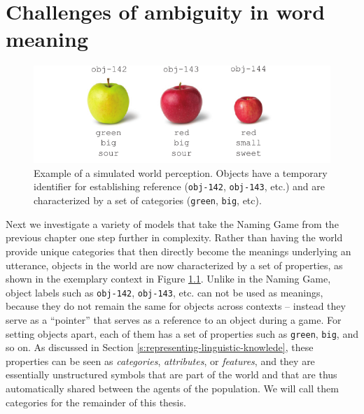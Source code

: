 
\setcounter{chapter}{4}

\chapter{Challenges of ambiguity in word meaning}
\label{c:gg}

\begin{figure}[t]
  \includegraphics[scale=0.85]{figures/sgg-example-perception-apples}
  \caption{Example of a simulated world perception. Objects have a
    temporary identifier for establishing reference (\texttt{obj-142},
    \texttt{obj-143}, etc.) and are characterized by a set of
    categories (\texttt{green}, \texttt{big}, etc).}
  \label{f:sgg-example-perception-apples}
\end{figure}

Next we investigate a variety of models that take the Naming Game from
the previous chapter one step further in complexity. Rather than
having the world provide unique categories that then directly become
the meanings underlying an utterance, objects in the world are now
characterized by a set of properties, as shown in the exemplary
context in Figure \ref{f:sgg-example-perception-apples}. Unlike in the
Naming Game, object labels such as \texttt{obj-142}, \texttt{obj-143},
etc. can not be used as meanings, because they do not remain the same
for objects across contexts -- instead they serve as a ``pointer''
that serves as a reference to an object during a game. For setting
objects apart, each of them has a set of properties such as
\texttt{green}, \texttt{big}, and so on. As discussed in Section
\ref{s:representing-linguistic-knowlede}, these properties can be seen
as \emph{categories}, \emph{attributes}, or \emph{features}, and they
are essentially unstructured symbols that are part of the world and
that are thus automatically shared between the agents of the
population. We will call them categories for the remainder of this
thesis.



